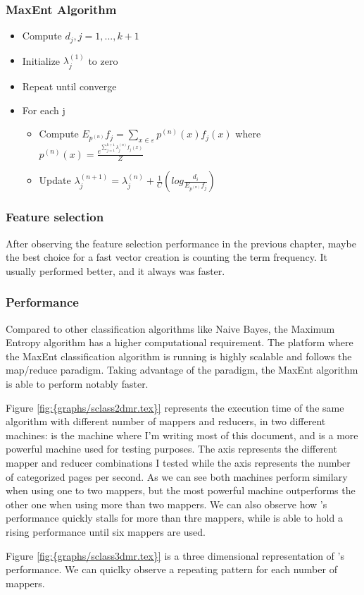 \subsubsection{MaxEnt Algorithm}


\begin{itemize}
\item Compute $d_j, j=1,...,k+1$
\item Initialize $\lambda_j^{(1)}$ to zero
\item Repeat until converge
\item For each j 
  \begin{itemize}
  \item Compute $E_{p^{(n)}} f_j = \sum\limits_{x \in \varepsilon} p^{(n)} (x)f_j(x)$
    where $p^{(n)}(x) = \frac{e^{\sum\limits_{j=1}^{k+1}\lambda_j^{(n)}f_j(x)}}{Z}$ 
  \item Update $\lambda_j^{(n+1)} = \lambda_j^{(n)} + \frac{1}{C}(log\frac{d_i}{E_{{p^{(n)}}}f_j})$
  \end{itemize}
\end{itemize}

  

\subsubsection{Feature selection}
After observing the feature selection performance in the previous chapter, maybe the best choice for a fast vector creation is counting the term frequency. It usually performed better, and it always
was faster.


\subsubsection{Performance}
Compared to other classification algorithms like Naive Bayes, the Maximum Entropy algorithm has a higher computational requirement. 
The platform where the MaxEnt classification algorithm is running is highly scalable and follows the map/reduce paradigm. Taking advantage of the paradigm, the MaxEnt algorithm
is able to perform notably faster.



Figure \ref{fig:{graphs/sclass2dmr.tex}} represents the execution time of the same algorithm with different number of mappers and reducers, in two different machines:  
is the machine where I'm writing most of this document, and  is a more powerful machine used for testing purposes. The  axis represents the 
different mapper and reducer combinations I tested while the  axis represents the number of categorized pages per second.
As we can see both machines perform similary when using one to two mappers, but the most powerful machine outperforms the other one when using more than two mappers. We can also observe how 's performance
quickly stalls for more than thre mappers, while  is able to hold a rising performance until six mappers are used.

Figure \ref{fig:{graphs/sclass3dmr.tex}} is a three dimensional representation of 's performance. We can quiclky observe a repeating pattern for each number of mappers.

